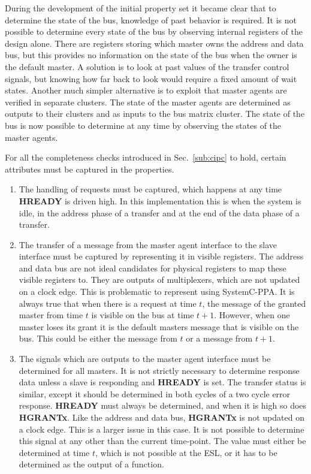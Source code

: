 During the development of the initial property set it became clear that to determine the state of the bus, knowledge of past behavior is required. It is not possible to determine every state of the bus by observing internal registers of the design alone. There are registers storing which master owns the address and data bus, but this provides no information on the state of the bus when the owner is the default master. A solution is to look at past values of the transfer  control signals, but knowing how far back to look would require a fixed amount of wait states. Another much simpler alternative is to exploit that master agents are verified in separate clusters. The state of the master agents are determined as outputs to their clusters and as inputs to the bus matrix cluster. The state of the bus is now possible to determine at any time by observing the states of the master agents. \par
For all the completeness checks introduced in Sec.~\ref{sub:cipc} to hold, certain attributes must be captured in the properties. 
\begin{enumerate}
 \item The handling of requests must be captured, which happens at any time \textbf{HREADY} is driven high. In this implementation this is when the system is idle, in the address phase of a transfer and at the end of the data phase of a transfer.
 \item The transfer of a message from the master agent interface to the slave interface must be captured by representing it in visible registers. The address and data bus are not ideal candidates for physical registers to map these visible registers to. They are outputs of multiplexers, which are not updated on a clock edge. This is problematic to represent using SystemC-PPA. It is always true that when there is a request at time $t$, the message of the granted master from time $t$ is visible on the bus at time $t+1$. However, when one master loses its grant it is the default masters message that is visible on the bus. This could be either the message from $t$ or a message from $t+1$.  
 \item The signals which are outputs to the master agent interface must be determined for all masters. It is not strictly necessary to determine response data unless a slave is responding and \textbf{HREADY} is set. The transfer status is similar, except it should be determined in both cycles of a two cycle error response. \textbf{HREADY} must always be determined, and when it is high so does \textbf{HGRANTx}. Like the address and data bus, \textbf{HGRANTx} is not updated on a clock edge. This is a larger issue in this case. It is not possible to determine this signal at any other than the current time-point. The value must either be determined at time $t$, which is not possible at the ESL, or it has to be determined as the output of a function. 
\end{enumerate} 

